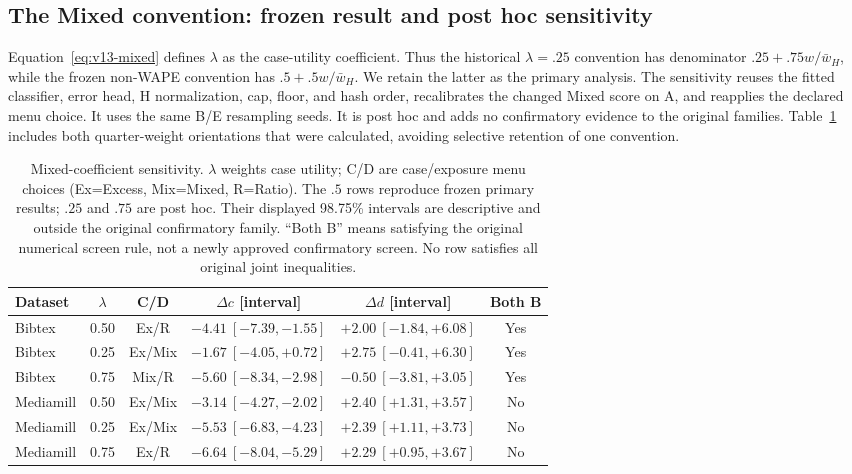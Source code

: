 \subsection{The Mixed convention: frozen result and post hoc sensitivity}
\label{sec:v13-lambda}
Equation~\ref{eq:v13-mixed} defines $\lambda$ as the case-utility coefficient. Thus the historical $\lambda=.25$ convention has denominator $.25+.75w/\bar w_H$, while the frozen non-WAPE convention has $.5+.5w/\bar w_H$. We retain the latter as the primary analysis. The sensitivity reuses the fitted classifier, error head, H normalization, cap, floor, and hash order, recalibrates the changed Mixed score on A, and reapplies the declared menu choice. It uses the same B/E resampling seeds. It is post hoc and adds no confirmatory evidence to the original families. Table~\ref{tab:v13-lambda} includes both quarter-weight orientations that were calculated, avoiding selective retention of one convention.

\begin{table}[H]\centering\small
\setlength{\tabcolsep}{3pt}
\caption{Mixed-coefficient sensitivity. $\lambda$ weights case utility; C/D are case/exposure menu choices (Ex=Excess, Mix=Mixed, R=Ratio). The $.5$ rows reproduce frozen primary results; $.25$ and $.75$ are post hoc. Their displayed 98.75\% intervals are descriptive and outside the original confirmatory family. ``Both B'' means satisfying the original numerical screen rule, not a newly approved confirmatory screen. No row satisfies all original joint inequalities.}
\label{tab:v13-lambda}
\begin{tabular}{lccccc}\toprule
Dataset & $\lambda$ & C/D & $\Delta c$ [interval] & $\Delta d$ [interval] & Both B\\\midrule
Bibtex & 0.50 & Ex/R & $-4.41\ [-7.39,-1.55]$ & $+2.00\ [-1.84,+6.08]$ & Yes \\
Bibtex & 0.25 & Ex/Mix & $-1.67\ [-4.05,+0.72]$ & $+2.75\ [-0.41,+6.30]$ & Yes \\
Bibtex & 0.75 & Mix/R & $-5.60\ [-8.34,-2.98]$ & $-0.50\ [-3.81,+3.05]$ & Yes \\
\midrule
Mediamill & 0.50 & Ex/Mix & $-3.14\ [-4.27,-2.02]$ & $+2.40\ [+1.31,+3.57]$ & No \\
Mediamill & 0.25 & Ex/Mix & $-5.53\ [-6.83,-4.23]$ & $+2.39\ [+1.11,+3.73]$ & No \\
Mediamill & 0.75 & Ex/R & $-6.64\ [-8.04,-5.29]$ & $+2.29\ [+0.95,+3.67]$ & No \\
\bottomrule\end{tabular}
\end{table}

